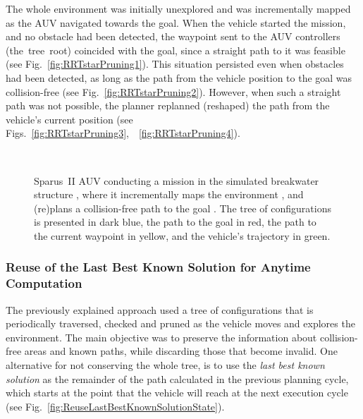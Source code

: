 The whole environment was initially unexplored and was incrementally mapped as
the \ac{AUV} navigated towards the goal. When the vehicle started the mission,
and no obstacle had been detected, the waypoint sent to the \ac{AUV} controllers
\mbox{(the tree root)} coincided with the goal, since a straight path to it was
feasible (see Fig.~\ref{fig:RRTstarPruning1}). This situation persisted even
when obstacles had been detected, as long as the path from the vehicle
position to the goal was collision-free (see Fig.~\ref{fig:RRTstarPruning2}).
However, when such a straight path was not possible, the planner replanned
(reshaped) the path from the vehicle's current position (see
Figs.~\ref{fig:RRTstarPruning3},~~\ref{fig:RRTstarPruning4}).


\begin{figure}[htbp]
\myfloatalign
     \quad
     \\
     \quad
\caption[Sparus~II AUV conducting a mission in the simulated
breakwater structure using the pruning tree approach.]
{Sparus~II \ac{AUV} conducting a mission in the simulated breakwater structure
\protect{}, where it incrementally maps the
environment \protect{},
\protect{} and (re)plans a collision-free path to the
goal \protect{}. The tree of configurations is
presented in dark blue, the path to the goal in red, the path to the current
waypoint in yellow, and the vehicle's trajectory in green.}
\label{fig:RRTstarPruning}
\end{figure}

\subsubsection{Reuse of the Last Best Known Solution for Anytime Computation}

The previously explained approach used a tree of configurations that is
periodically traversed, checked and pruned as the vehicle moves and explores the
environment. The main objective was to preserve the information about
collision-free areas and known paths, while discarding those that become
invalid. One alternative for not conserving the whole tree, is to use the
\textit{last best known solution} as the remainder of the path calculated in the
previous planning cycle, which starts at the point that the vehicle will reach
at the next execution cycle (see
Fig.~\ref{fig:ReuseLastBestKnownSolutionState}). 

